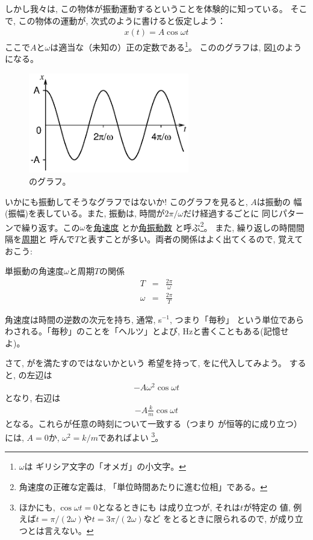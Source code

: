 しかし我々は, この物体が振動運動するということを体験的に知っている。
そこで, この物体の運動が, 次式のように書けると仮定しよう：
\begin{eqnarray}
x(t)=A\cos\omega t\label{eq:spring_Acos}
\end{eqnarray}
ここで$A$と$\omega$は適当な（未知の）正の定数である\footnote{$\omega$は
ギリシア文字の「オメガ」の小文字。}。
こののグラフは, 図\ref{fig:springAcos}のようになる。
\begin{figure}[h]
    \centering
    \includegraphics[width=7.0cm]{springAcos.eps}
    \caption{のグラフ。}\label{fig:springAcos}
\end{figure}
いかにも振動してそうなグラフではないか! このグラフを見ると, $A$は振動の
幅(振幅)を表している。また, 振動は, 時間が$2\pi/\omega$だけ経過するごとに
同じパターンで繰り返す。この$\omega$を\underline{角速度}
とか\underline{角振動数}
と呼ぶ\footnote{角速度の正確な定義は, 「単位時間あたりに進む位相」である。}。
また, 繰り返しの時間間隔を\underline{周期}と
呼んで$T$と表すことが多い。両者の関係はよく出てくるので, 
覚えておこう: 
\begin{itembox}{単振動の角速度$\omega$と周期$T$の関係}
\begin{eqnarray}
T&=&\frac{2\pi}{\omega}\label{eq:vib_period}\\
\omega&=&\frac{2\pi}{T}
\end{eqnarray}
\end{itembox}

角速度は時間の逆数の次元を持ち, 通常, s$^{-1}$, つまり「毎秒」
という単位であらわされる。「毎秒」のことを「ヘルツ」とよび, Hzと書くこともある(記憶せよ)。

さて, がを満たすのではないかという
希望を持って, をに代入してみよう。
すると, の左辺は
\begin{eqnarray}-A\omega^2\cos\omega t\end{eqnarray}
となり, 右辺は
\begin{eqnarray}-A\frac{k}{m}\cos\omega t\end{eqnarray}
となる。これらが任意の時刻について一致する（つまり
が恒等的に成り立つ）には, $A=0$か, $\omega^2=k/m$であればよい
\footnote{ほかにも, $\cos\omega t=0$となるときにも
は成り立つが, それは$t$が特定の
値, 例えば$t=\pi/(2\omega)$や$t=3\pi/(2\omega)$など
をとるときに限られるので, 
が成り立つとは言えない。}。

